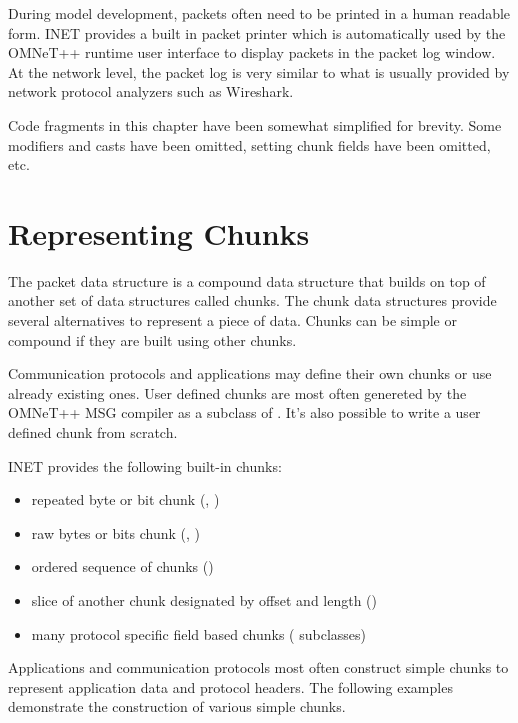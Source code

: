 During model development, packets often need to be printed in a human
readable form. INET provides a built in packet printer which is
automatically used by the OMNeT++ runtime user interface to display packets
in the packet log window. At the network level, the packet log is very
similar to what is usually provided by network protocol analyzers such as
Wireshark.

\begin{note}
Code fragments in this chapter have been somewhat simplified for brevity.
Some  modifiers and  casts have been omitted,
setting chunk fields have been omitted, etc.
\end{note}

\section{Representing Chunks}

The packet data structure is a compound data structure that builds on top
of another set of data structures called chunks. The chunk data structures
provide several alternatives to represent a piece of data. Chunks can be
simple or compound if they are built using other chunks.

Communication protocols and applications may define their own chunks or use
already existing ones. User defined chunks are most often genereted by the
OMNeT++ MSG compiler as a subclass of . It's also
possible to write a user defined chunk from scratch.

INET provides the following built-in chunks:

\begin{itemize}
    \item   repeated byte or bit chunk (, )
    \item   raw bytes or bits chunk (, )
    \item   ordered sequence of chunks ()
    \item   slice of another chunk designated by offset and length ()
    \item   many protocol specific field based chunks ( subclasses)
\end{itemize}

Applications and communication protocols most often construct simple chunks
to represent application data and protocol headers. The following examples
demonstrate the construction of various simple chunks.

